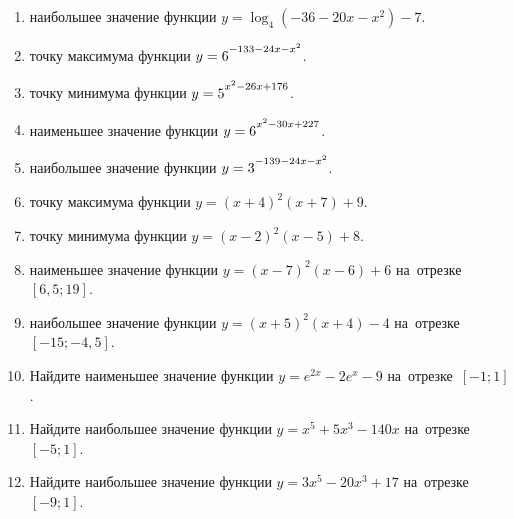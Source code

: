 \documentclass[a4paper,10pt]{article}
\begin{document}
\begin{enumerate}
\item {} наибольшее значение функции $y=\log_4\left(-36-20x-x^2\right)-7$.

\item {} точку максимума функции $y=6\strut^{-133-24x-x^2}$.

\item {} точку минимума функции $y=5\strut^{x^2-26x+176}$.

\item {} наименьшее значение функции $y=6\strut^{x^2-30x+227}$.

\item {} наибольшее значение функции $y=3\strut^{-139-24x-x^2}$.

\item {} точку максимума функции $y=\left(x+4\right)^2\left(x+7\right)+9$.

\item {} точку минимума функции $y=\left(x-2\right)^2\left(x-5\right)+8$.

\item {} наименьшее значение функции $y=\left(x-7\right)^2\left(x-6\right)+6$ на~отрезке~$\left[6{,}5;19\right]$.

\item {} наибольшее значение функции $y=\left(x+5\right)^2\left(x+4\right)-4$ на~отрезке~$\left[-15;-4{,}5\right]$.

\item Найдите наименьшее значение функции $y=e^{2x}-2e^x-9$ на~отрезке~$\left[-1;1\right]$.

\item Найдите наибольшее значение функции $y=x^5+5x^3-140x$ на~отрезке~$\left[-5;1\right]$.

\item Найдите наибольшее значение функции $y=3x^5-20x^3+17$ на~отрезке~$\left[-9;1\right]$.

\end{enumerate}
\end{document}
